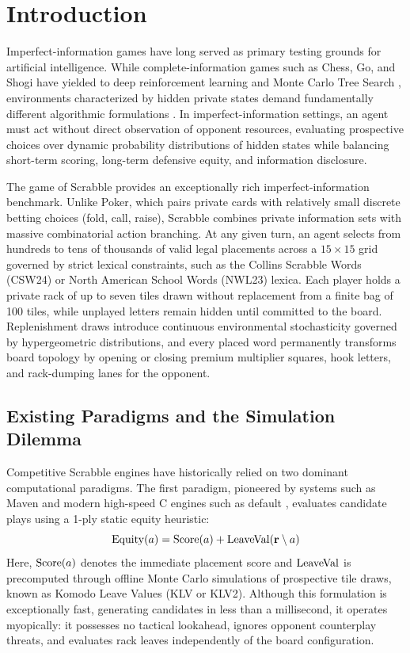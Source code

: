 \section{Introduction}
\label{sec:introduction}

Imperfect-information games have long served as primary testing grounds for artificial intelligence. While complete-information games such as Chess, Go, and Shogi have yielded to deep reinforcement learning and Monte Carlo Tree Search \citep{silver2016mastering, silver2017mastering}, environments characterized by hidden private states demand fundamentally different algorithmic formulations \citep{moravcik2017deepstack, brown2019superhuman, sokota2026scalable}. In imperfect-information settings, an agent must act without direct observation of opponent resources, evaluating prospective choices over dynamic probability distributions of hidden states while balancing short-term scoring, long-term defensive equity, and information disclosure.

The game of Scrabble provides an exceptionally rich imperfect-information benchmark. Unlike Poker, which pairs private cards with relatively small discrete betting choices (fold, call, raise), Scrabble combines private information sets with massive combinatorial action branching. At any given turn, an agent selects from hundreds to tens of thousands of valid legal placements across a $15 \times 15$ grid governed by strict lexical constraints, such as the Collins Scrabble Words (CSW24) or North American School Words (NWL23) lexica. Each player holds a private rack of up to seven tiles drawn without replacement from a finite bag of 100 tiles, while unplayed letters remain hidden until committed to the board. Replenishment draws introduce continuous environmental stochasticity governed by hypergeometric distributions, and every placed word permanently transforms board topology by opening or closing premium multiplier squares, hook letters, and rack-dumping lanes for the opponent.

\subsection{Existing Paradigms and the Simulation Dilemma}

Competitive Scrabble engines have historically relied on two dominant computational paradigms. The first paradigm, pioneered by systems such as Maven \citep{sheppard2002world} and modern high-speed C engines such as default \magpie, evaluates candidate plays using a 1-ply static equity heuristic:
\begin{equation}
    \label{eq:static_equity}
    \mathrm{Equity}(a) = \mathrm{Score}(a) + \mathrm{LeaveVal}(\mathbf{r} \setminus a)
\end{equation}
Here, $\mathrm{Score}(a)$ denotes the immediate placement score and $\mathrm{LeaveVal}$ is precomputed through offline Monte Carlo simulations of prospective tile draws, known as Komodo Leave Values (KLV or KLV2). Although this formulation is exceptionally fast, generating candidates in less than a millisecond, it operates myopically: it possesses no tactical lookahead, ignores opponent counterplay threats, and evaluates rack leaves independently of the board configuration.

